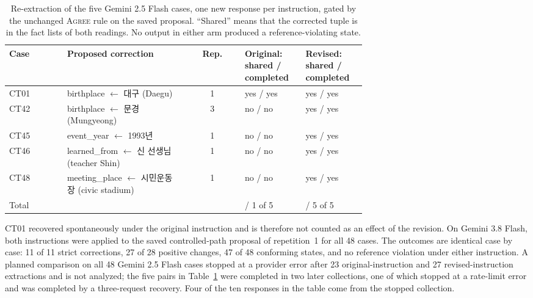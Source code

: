 \documentclass[acmsmall,review]{acmart}
\newcommand{\agree}{\textsc{Agree}}
\begin{document}
\begin{table}[H]
\centering
\caption{Re-extraction of the five Gemini 2.5 Flash cases, one new response per instruction, gated by the unchanged \agree{} rule on the saved proposal. ``Shared'' means that the corrected tuple is in the fact lists of both readings. No output in either arm produced a reference-violating state.}\label{tab:M1}
\small
\setlength{\tabcolsep}{3pt}
\begin{tabular}{@{}l>{\raggedright\arraybackslash}p{0.34\linewidth}c>{\raggedright\arraybackslash}p{0.17\linewidth}>{\raggedright\arraybackslash}p{0.17\linewidth}@{}}
\toprule
\textbf{Case} & \textbf{Proposed correction} & \textbf{Rep.} & \textbf{Original: shared / completed} & \textbf{Revised: shared / completed} \\
\midrule
CT01 & birthplace $\leftarrow$ 대구 (Daegu) & 1 & yes / yes & yes / yes \\
CT42 & birthplace $\leftarrow$ 문경 (Mungyeong) & 3 & no / no & yes / yes \\
CT45 & event\_year $\leftarrow$ 1993년 & 1 & no / no & yes / yes \\
CT46 & learned\_from $\leftarrow$ 신 선생님 (teacher Shin) & 1 & no / no & yes / yes \\
CT48 & meeting\_place $\leftarrow$ 시민운동장 (civic stadium) & 1 & no / no & yes / yes \\
\addlinespace[2pt]
Total & & & 1 / 1 of 5 & 5 / 5 of 5 \\
\bottomrule
\end{tabular}
\end{table}

CT01 recovered spontaneously under the original instruction and is therefore not counted as an effect of the revision. On Gemini 3.8 Flash, both instructions were applied to the saved controlled-path proposal of repetition~1 for all 48 cases. The outcomes are identical case by case: 11 of 11 strict corrections, 27 of 28 positive changes, 47 of 48 conforming states, and no reference violation under either instruction. A planned comparison on all 48 Gemini 2.5 Flash cases stopped at a provider error after 23 original-instruction and 27 revised-instruction extractions and is not analyzed; the five pairs in Table~\ref{tab:M1} were completed in two later collections, one of which stopped at a rate-limit error and was completed by a three-request recovery. Four of the ten responses in the table come from the stopped collection.
\end{document}
